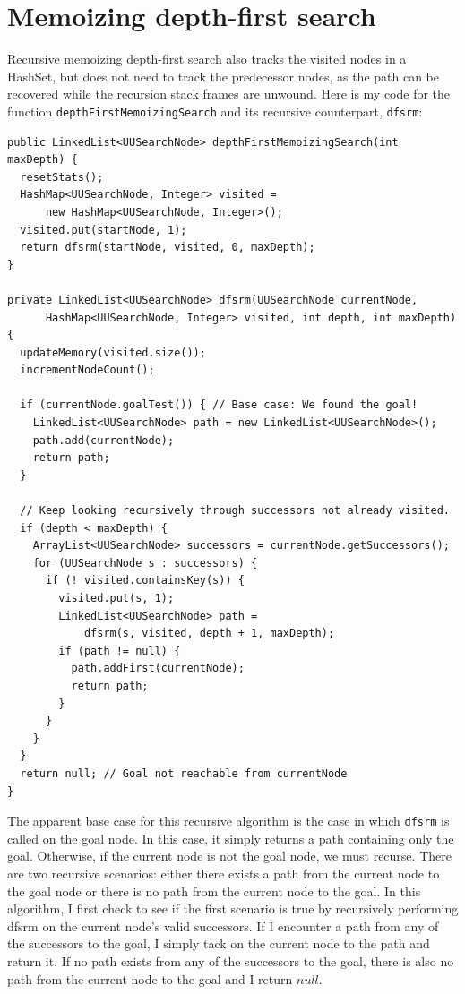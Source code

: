 \documentclass{article}
\begin{document}
\section{Memoizing depth-first search}

Recursive memoizing depth-first search also tracks the visited nodes in a HashSet, but does not need to track the predecessor nodes, as the path can be recovered while the recursion stack frames are unwound. Here is my code for the function \verb`depthFirstMemoizingSearch` and its recursive counterpart, \verb`dfsrm`:

\begin{lstlisting}
public LinkedList<UUSearchNode> depthFirstMemoizingSearch(int maxDepth) {
  resetStats(); 
  HashMap<UUSearchNode, Integer> visited = 
      new HashMap<UUSearchNode, Integer>();
  visited.put(startNode, 1);
  return dfsrm(startNode, visited, 0, maxDepth);
}

private LinkedList<UUSearchNode> dfsrm(UUSearchNode currentNode, 
      HashMap<UUSearchNode, Integer> visited, int depth, int maxDepth) {
  updateMemory(visited.size());
  incrementNodeCount();

  if (currentNode.goalTest()) { // Base case: We found the goal!
    LinkedList<UUSearchNode> path = new LinkedList<UUSearchNode>();
    path.add(currentNode);
    return path;
  }
  
  // Keep looking recursively through successors not already visited.
  if (depth < maxDepth) {
    ArrayList<UUSearchNode> successors = currentNode.getSuccessors();
    for (UUSearchNode s : successors) {
      if (! visited.containsKey(s)) {
        visited.put(s, 1);
        LinkedList<UUSearchNode> path = 
            dfsrm(s, visited, depth + 1, maxDepth);
        if (path != null) {
          path.addFirst(currentNode);
          return path;
        }
      }
    }
  }
  return null; // Goal not reachable from currentNode
}
\end{lstlisting}

The apparent base case for this recursive algorithm is the case in which \verb`dfsrm` is called on the goal node. In this case, it simply returns a path containing only the goal. Otherwise, if the current node is not the goal node, we must recurse. There are two recursive scenarios: either there exists a path from the current node to the goal node or there is no path from the current node to the goal. In this algorithm, I first check to see if the first scenario is true by recursively performing dfsrm on the current node's valid successors. If I encounter a path from any of the successors to the goal, I simply tack on the current node to the path and return it. If no path exists from any of the successors to the goal, there is also no path from the current node to the goal and I return $null$.
\end{document}
